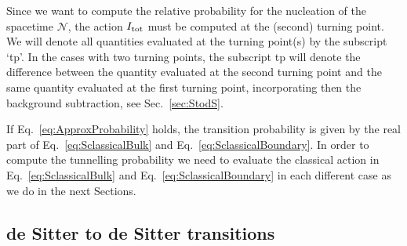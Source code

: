 \documentclass[11pt,a4paper]{article}
\begin{document}
Since we want to compute the relative probability for the nucleation of the spacetime $\mathcal{N}$, the action $I_{\rm tot}$ must be computed at the (second) turning point. We will denote all quantities evaluated at the turning point(s) by the subscript `tp'. In the cases with two turning points, the subscript tp will denote the difference between the quantity evaluated at the second turning point and the same quantity evaluated at the first turning point, incorporating then the background subtraction, see Sec.~\ref{sec:StodS}.

If Eq.~\eqref{eq:ApproxProbability} holds, the transition probability is given by the real part of Eq.~\eqref{eq:SclassicalBulk} and Eq.~\eqref{eq:SclassicalBoundary}. In order to compute the tunnelling probability we need to evaluate the classical action in Eq.~\eqref{eq:SclassicalBulk} and Eq.~\eqref{eq:SclassicalBoundary} in each different case as we do in the next Sections.

\subsection{de Sitter to de Sitter transitions}
\label{sec:dSdStransitions}
\end{document}
